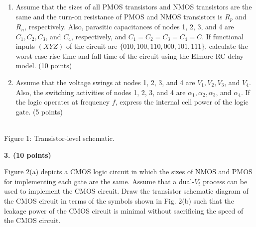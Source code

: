 \documentclass[10pt]{article}
\newcommand{\mos}[4]{\begin{scope}[shift={(#1,#2)}]
\draw (0,.24)--(0,-.24);\draw (0,.20)--(.25,.20)--(.25,.5);
\draw (0,-.20)--(.25,-.20)--(.25,-.5);\draw (-.16,.23)--(-.16,-.23);
\ifnum#4=1\draw (-.26,0) circle (.06);\draw (-.75,0)--(-.32,0);\else\draw (-.75,0)--(-.16,0);\fi
\node[anchor=east,font=\scriptsize] at (-.76,0) {$#3$};\end{scope}}
\newcommand{\ground}[2]{\draw (#1,#2)--(#1,{#2-.12});\draw ({#1-.17},{#2-.12})--({#1+.17},{#2-.12});\draw ({#1-.11},{#2-.20})--({#1+.11},{#2-.20});}
\newcommand{\rail}[3]{\draw (#1,#2)--(#1,{#2+.14});\node[above,font=\scriptsize] at (#1,{#2+.14}) {$#3$};}
\newcommand{\qheading}[1]{\par\medskip\textbf{#1}\par}
\begin{document}
\begin{enumerate}[label=(\alph*),leftmargin=7mm]
\item Assume that the sizes of all PMOS transistors and NMOS transistors are the same and the turn-on resistance of PMOS and NMOS transistors is $R_p$ and $R_n$, respectively. Also, parasitic capacitances of nodes 1, 2, 3, and 4 are $C_1,C_2,C_3$, and $C_4$, respectively, and $C_1=C_2=C_3=C_4=C$. If functional inputs $(XYZ)$ of the circuit are $\{010,100,110,000,101,111\}$, calculate the worst-case rise time and fall time of the circuit using the Elmore RC delay model. (10 points)
\item Assume that the voltage swings at nodes 1, 2, 3, and 4 are $V_1,V_2,V_3$, and $V_4$. Also, the switching activities of nodes 1, 2, 3, and 4 are $\alpha_1,\alpha_2,\alpha_3$, and $\alpha_4$. If the logic operates at frequency $f$, express the internal cell power of the logic gate. (5 points)
\end{enumerate}
\begin{center}\\\small Figure 1: Transistor-level schematic.\end{center}
\newpage
\qheading{3. (10 points)} Figure 2(a) depicts a CMOS logic circuit in which the sizes of NMOS and PMOS for implementing each gate are the same. Assume that a dual-$V_t$ process can be used to implement the CMOS circuit. Draw the transistor schematic diagram of the CMOS circuit in terms of the symbols shown in Fig. 2(b) such that the leakage power of the CMOS circuit is minimal without sacrificing the speed of the CMOS circuit.
\end{document}
